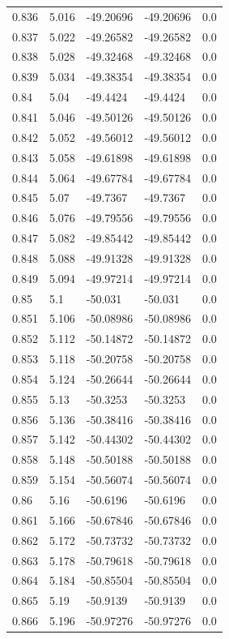 \begin{tabular}{lllll}
0.836 & 5.016 & -49.20696 & -49.20696 & 0.0 \\
0.837 & 5.022 & -49.26582 & -49.26582 & 0.0 \\
0.838 & 5.028 & -49.32468 & -49.32468 & 0.0 \\
0.839 & 5.034 & -49.38354 & -49.38354 & 0.0 \\
0.84 & 5.04 & -49.4424 & -49.4424 & 0.0 \\
0.841 & 5.046 & -49.50126 & -49.50126 & 0.0 \\
0.842 & 5.052 & -49.56012 & -49.56012 & 0.0 \\
0.843 & 5.058 & -49.61898 & -49.61898 & 0.0 \\
0.844 & 5.064 & -49.67784 & -49.67784 & 0.0 \\
0.845 & 5.07 & -49.7367 & -49.7367 & 0.0 \\
0.846 & 5.076 & -49.79556 & -49.79556 & 0.0 \\
0.847 & 5.082 & -49.85442 & -49.85442 & 0.0 \\
0.848 & 5.088 & -49.91328 & -49.91328 & 0.0 \\
0.849 & 5.094 & -49.97214 & -49.97214 & 0.0 \\
0.85 & 5.1 & -50.031 & -50.031 & 0.0 \\
0.851 & 5.106 & -50.08986 & -50.08986 & 0.0 \\
0.852 & 5.112 & -50.14872 & -50.14872 & 0.0 \\
0.853 & 5.118 & -50.20758 & -50.20758 & 0.0 \\
0.854 & 5.124 & -50.26644 & -50.26644 & 0.0 \\
0.855 & 5.13 & -50.3253 & -50.3253 & 0.0 \\
0.856 & 5.136 & -50.38416 & -50.38416 & 0.0 \\
0.857 & 5.142 & -50.44302 & -50.44302 & 0.0 \\
0.858 & 5.148 & -50.50188 & -50.50188 & 0.0 \\
0.859 & 5.154 & -50.56074 & -50.56074 & 0.0 \\
0.86 & 5.16 & -50.6196 & -50.6196 & 0.0 \\
0.861 & 5.166 & -50.67846 & -50.67846 & 0.0 \\
0.862 & 5.172 & -50.73732 & -50.73732 & 0.0 \\
0.863 & 5.178 & -50.79618 & -50.79618 & 0.0 \\
0.864 & 5.184 & -50.85504 & -50.85504 & 0.0 \\
0.865 & 5.19 & -50.9139 & -50.9139 & 0.0 \\
0.866 & 5.196 & -50.97276 & -50.97276 & 0.0 \\

\end{tabular}
